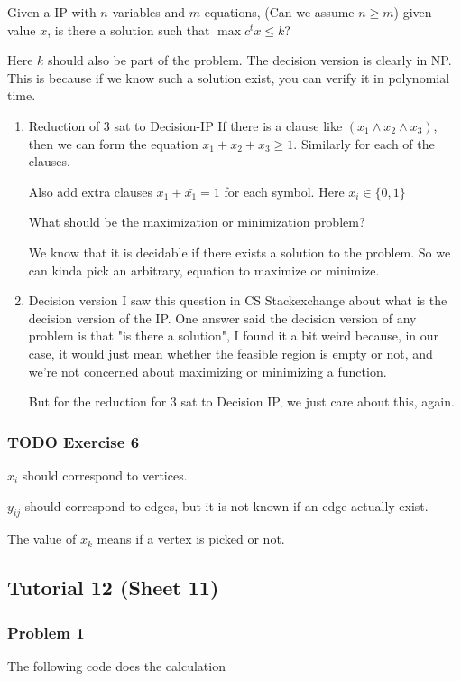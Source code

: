 \documentclass[11pt]{article}
\def\max{\operatorname{max}}
\begin{document}
Given a IP with \(n\) variables and \(m\) equations, (Can we assume \(n \ge m\))
given value \(x\), is there a solution such that \(\max c^t x \le k\)?

Here \(k\) should also be part of the problem. The decision version is clearly
in NP. This is because if we know such a solution exist, you can verify it
in polynomial time.
\begin{enumerate}
\item Reduction of 3 sat to Decision-IP
\label{sec:orgf3fe8ae}
If there is a clause like \((x_1 \wedge x_2 \wedge x_3)\), then we can form
the equation \(x_1 + x_2 + x_3 \ge 1\). Similarly for each of the clauses.

Also add extra clauses \(x_1 + \bar{x_1} = 1\) for each symbol. Here \(x_i \in \{0, 1\}\)

What should be the maximization or minimization problem?

We know that it is decidable if there exists a solution to the problem. So
we can kinda pick an arbitrary, equation to maximize or minimize.
\item Decision version
\label{sec:org4a56f70}
I saw this question in CS Stackexchange about what is the decision version
of the IP. One answer said the decision version of any problem is that "is
there a solution", I found it a bit weird because, in our case, it would
just mean whether the feasible region is empty or not, and we're not
concerned about maximizing or minimizing a function.

But for the reduction for \(3\) sat to Decision IP, we just care about this,
again.
\end{enumerate}
\subsubsection{{\bfseries\sffamily TODO} Exercise 6}
\label{sec:org89b9e97}
\(x_i\) should correspond to vertices.

\(y_{ij}\) should correspond to edges, but it is not known if an edge actually
exist.

The value of \(x_k\) means if a vertex is picked or not.
\subsection{Tutorial 12 (Sheet 11)}
\label{sec:orgc4f1a9b}
\subsubsection{Problem 1}
\label{sec:orga03fd7e}
The following code does the calculation
\end{document}
